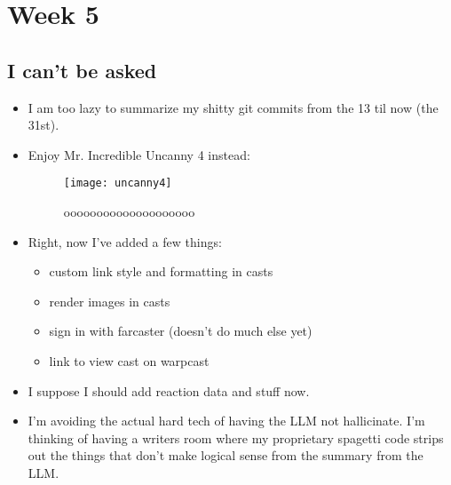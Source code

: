 \newpage
\section{Week 5}
\subsection*{I can't be asked}
\begin{itemize}
    \item I am too lazy to summarize my shitty git commits from the 13 til now
        (the 31st).
    \item Enjoy Mr. Incredible Uncanny 4 instead:
    \begin{figure}[ht]
        \centering
        \texttt{[image: uncanny4]}
        \captionsetup{labelfont=bf, textfont=it}
        \caption{oooooooooooooooooooo}
        \label{fig:uncanny4}
    \end{figure}
    \item Right, now I've added a few things:
        \begin{itemize}
            \item custom link style and formatting in casts 
            \item render images in casts
            \item sign in with farcaster (doesn't do much else yet)
            \item link to view cast on warpcast 
        \end{itemize}
    \item I suppose I should add reaction data and stuff now.
    \item I'm avoiding the actual hard tech of having the LLM not hallicinate.
        I'm thinking of having a writers room where my proprietary spagetti code
        strips out the things that don't make logical sense from the summary
        from the LLM.
\end{itemize}
\clearpage
